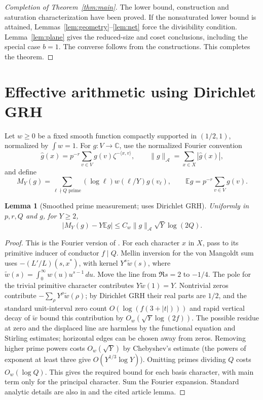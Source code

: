 \documentclass[11pt]{article}
\newtheorem{lemma}[theorem]{Lemma}
\theoremstyle{remark}\newtheorem{remark}[theorem]{Remark}
\newcommand{\C}{\mathbb C}
\newcommand{\E}{\mathbb E}
\begin{document}
\begin{proof}[Completion of Theorem~\ref{thm:main}]
The lower bound, construction and saturation characterization have been proved. If the nonsaturated lower bound is attained, Lemmas~\ref{lem:geometry}--\ref{lem:net} force the divisibility condition. Lemma~\ref{lem:plane} gives the reduced-size and coset conclusions, including the special case $b=1$. The converse follows from the constructions. This completes the theorem.
\end{proof}

\section{Effective arithmetic using Dirichlet GRH}
Let $w\ge0$ be a fixed smooth function compactly supported in $(1/2,1)$, normalized by $\int w=1$. For $g:V\to\C$, use the normalized Fourier convention
\[
 \widehat g(x)=p^{-r}\sum_{v\in V}g(v)\zeta^{-\langle x,v\rangle},\qquad
 \|g\|_{\mathcal A}=\sum_{x\in X}|\widehat g(x)|,
\]
and define
\[
 M_Y(g)=\sum_{\ell\nmid Q\text{ prime}}(\log\ell)w(\ell/Y)g(v_\ell),
 \qquad \E g=p^{-r}\sum_{v\in V}g(v).
\]
\begin{lemma}[Smoothed prime measurement; uses Dirichlet GRH]\label{lem:prime}
Uniformly in $p,r,Q$ and $g$, for $Y\ge2$,
\begin{equation}\label{eq:prime}
 |M_Y(g)-Y\E g|\le C_w\|g\|_{\mathcal A}\sqrt Y\log(2Q).
\end{equation}
\end{lemma}
\begin{proof}
This is the Fourier version of \cite[\texttt{rec:lem:gram}]{article}. For each character $x$ in $X$, pass to its primitive inducer of conductor $f\mid Q$. Mellin inversion for the von Mangoldt sum uses $-(L'/L)(s,x^*)$, with kernel $Y^s\widetilde w(s)$, where $\widetilde w(s)=\int_0^\infty w(u)u^{s-1}\,du$. Move the line from $\Re s=2$ to $-1/4$. The pole for the trivial primitive character contributes $Y\widetilde w(1)=Y$. Nontrivial zeros contribute $-\sum_\rho Y^\rho\widetilde w(\rho)$; by Dirichlet GRH their real parts are $1/2$, and the standard unit-interval zero count $O(\log(f(3+|t|)))$ and rapid vertical decay of $\widetilde w$ bound this contribution by $O_w(\sqrt Y\log(2f))$. The possible residue at zero and the displaced line are harmless by the functional equation and Stirling estimates; horizontal edges can be chosen away from zeros. Removing higher prime powers costs $O_w(\sqrt Y)$ by Chebyshev's estimate (the powers of exponent at least three give $O(Y^{1/3}\log Y)$). Omitting primes dividing $Q$ costs $O_w(\log Q)$. This gives the required bound for each basis character, with main term only for the principal character. Sum the Fourier expansion. Standard analytic details are also in \cite{Davenport} and the cited article lemma.
\end{proof}
\end{document}
